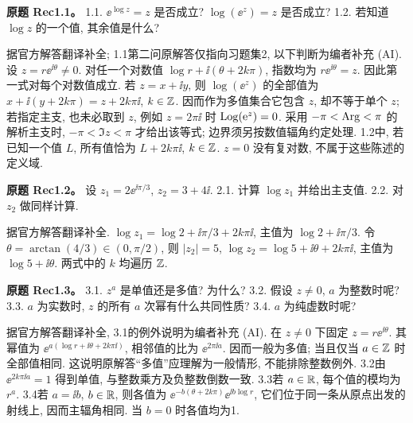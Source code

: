\begin{exercise}
\textbf{原题 Rec1.1。}\label{ass:rec1-1}
1.1. $\ee^{\log z}=z$ 是否成立? $\log(\ee^z)=z$ 是否成立? 1.2. 若知道 $\log z$ 的一个值, 其余值是什么?
\end{exercise}
\begin{solution}
据官方解答翻译补全; 1.1第二问原解答仅指向习题集2, 以下判断为编者补充 (AI). 设 $z=r\ee^{\ii\theta}\ne0$. 对任一个对数值 $\log r+\ii(\theta+2k\pi)$, 指数均为 $r\ee^{\ii\theta}=z$. 因此第一式对每个对数值成立. 若 $z=x+\ii y$, 则 $\log(\ee^z)$ 的全部值为 $x+\ii(y+2k\pi)=z+2k\pi\ii$, $k\in\mathbb Z$. 因而作为多值集合它包含 $z$, 却不等于单个 $z$; 若指定主支, 也未必取到 $z$, 例如 $z=2\pi\ii$ 时 $\operatorname{Log}(\mathrm e^z)=0$. 采用 $-\pi<\operatorname{Arg}<\pi$ 的解析主支时, $-\pi<\Im z<\pi$ 才给出该等式; 边界须另按数值辐角约定处理. 1.2中, 若已知一个值 $L$, 所有值恰为 $L+2k\pi\ii$, $k\in\mathbb Z$. $z=0$ 没有复对数, 不属于这些陈述的定义域.
\end{solution}
\begin{exercise}
\textbf{原题 Rec1.2。}\label{ass:rec1-2}
设 $z_1=2\ee^{\ii\pi/3}$, $z_2=3+4\ii$. 2.1. 计算 $\log z_1$ 并给出主支值. 2.2. 对 $z_2$ 做同样计算.
\end{exercise}
\begin{solution}
据官方解答翻译补全. $\log z_1=\log2+\ii\pi/3+2k\pi\ii$, 主值为 $\log2+\ii\pi/3$. 令 $\theta=\arctan(4/3)\in(0,\pi/2)$, 则 $|z_2|=5$, $\log z_2=\log5+\ii\theta+2k\pi\ii$, 主值为 $\log5+\ii\theta$. 两式中的 $k$ 均遍历 $\mathbb Z$.
\end{solution}
\begin{exercise}
\textbf{原题 Rec1.3。}\label{ass:rec1-3}
3.1. $z^a$ 是单值还是多值? 为什么? 3.2. 假设 $z\ne0$, $a$ 为整数时呢? 3.3. $a$ 为实数时, $z$ 的所有 $a$ 次幂有什么共同性质? 3.4. $a$ 为纯虚数时呢?
\end{exercise}
\begin{solution}
据官方解答翻译补全, 3.1的例外说明为编者补充 (AI). 在 $z\ne0$ 下固定 $z=r\ee^{\ii\theta}$. 其幂值为 $\ee^{a(\log r+\ii\theta+2k\pi\ii)}$, 相邻值的比为 $\ee^{2\pi\ii a}$. 因而一般为多值; 当且仅当 $a\in\mathbb Z$ 时全部值相同. 这说明原解答“多值”应理解为一般情形, 不能排除整数例外. 3.2由 $\ee^{2k\pi\ii a}=1$ 得到单值, 与整数乘方及负整数倒数一致. 3.3若 $a\in\mathbb R$, 每个值的模均为 $r^a$. 3.4若 $a=\ii b$, $b\in\mathbb R$, 则各值为 $\ee^{-b(\theta+2k\pi)}\ee^{\ii b\log r}$, 它们位于同一条从原点出发的射线上, 因而主辐角相同. 当 $b=0$ 时各值均为1.
\end{solution}
